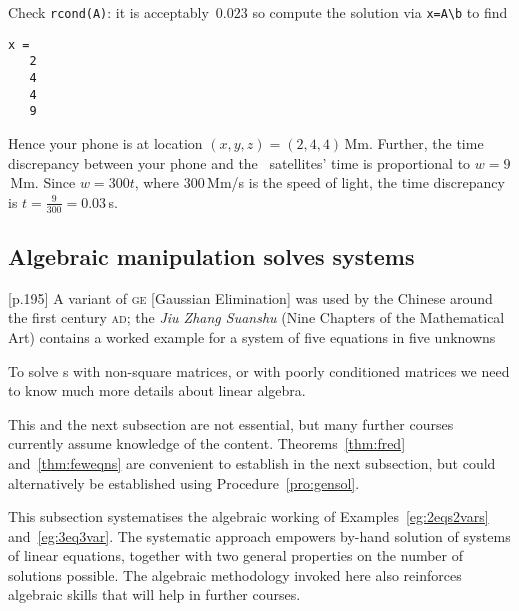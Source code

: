 \begin{example}
\begin{solution}
Check \verb|rcond(A)|: it is acceptably~\(0.023\) so compute the solution via \verb|x=A\b| to find
\setbox\ajrqrbox\hbox{}%
\marginpar{\usebox{\ajrqrbox\\[2ex]}}%
\begin{verbatim}
x =
   2
   4
   4
   9
\end{verbatim}
Hence your phone is at location \((x,y,z)=(2,4,4)\)\,Mm. 
Further, the time discrepancy between your phone and the \gps\ satellites' time is proportional to \(w=9\)\,Mm.
Since \(w=300t\), where \(300\)\,Mm/s is the speed of light, the time discrepancy is \(t=\frac9{300}=0.03\)\,s.
\end{solution}
\end{example}








\subsection{Algebraic manipulation solves systems}
\label{sec:amss}

\begin{quoted}{\cite{Higham1996} [p.195]}
A variant of \textsc{ge} [Gaussian Elimination] was used by the Chinese around the first century \textsc{ad}; the \emph{Jiu Zhang Suanshu} (Nine Chapters of the Mathematical Art) contains a worked example for a system of five equations in five unknowns
\end{quoted}

To solve s with non-square matrices, or with poorly conditioned matrices we need to know much more details about linear algebra.

\Needspace{14ex}
\begin{aside}
This and the next subsection are not essential, but many further courses currently assume knowledge of the content. 
Theorems~\ref{thm:fred} and~\ref{thm:feweqns} are convenient to establish in the next subsection, but could alternatively be established using Procedure~\ref{pro:gensol}. 
\end{aside}
This subsection systematises the algebraic working of Examples~\ref{eg:2eqs2vars} and~\ref{eg:3eq3var}.
The systematic approach empowers by-hand solution of systems of linear equations, together with two general properties on the number of solutions possible.
The algebraic methodology invoked here also reinforces algebraic skills that will help in further courses.

